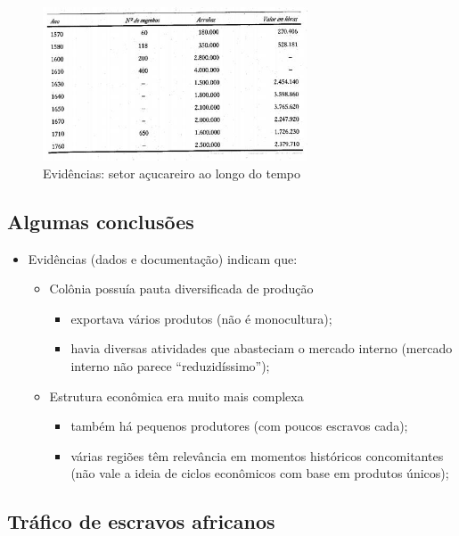 \documentclass[a4paper,12pt]{article}[abntex2]
\begin{document}
\begin{figure}[H]
    \centering
    \includegraphics[width=0.7\textwidth]{Imagens Slides/i2a4.png}
    \caption{Evidências: setor açucareiro ao longo do tempo}
\end{figure}

\subsection{\textbf{Algumas conclusões}}

\begin{itemize}
    \item Evidências (dados e documentação) indicam que:
    \begin{itemize}
        \item Colônia possuía pauta diversificada de produção
        \begin{itemize}
            \item exportava vários produtos (não é monocultura);
            \item havia diversas atividades que abasteciam o mercado interno (mercado interno não parece “reduzidíssimo”);
        \end{itemize}
        \item Estrutura econômica era muito mais complexa
        \begin{itemize}
            \item também há pequenos produtores (com poucos escravos cada);
            \item várias regiões têm relevância em momentos históricos concomitantes (não vale a ideia de ciclos econômicos com base em produtos únicos);
        \end{itemize}
    \end{itemize}
\end{itemize}

\subsection{\textbf{Tráfico de escravos africanos}}
\end{document}
